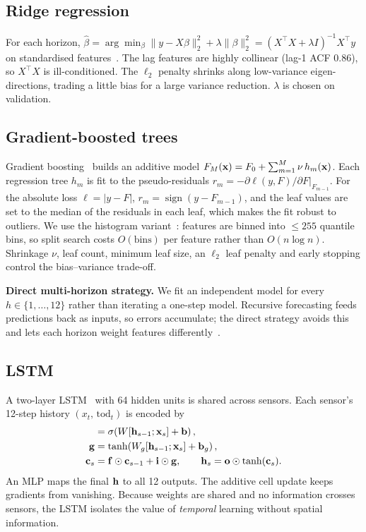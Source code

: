 \subsection{Ridge regression}
For each horizon, $\hat{\beta}=\arg\min_\beta\|y-X\beta\|_2^2+\lambda\|\beta\|_2^2
=(X^\top X+\lambda I)^{-1}X^\top y$ on standardised features~\cite{hoerl1970}. The lag
features are highly collinear (lag-1 ACF 0.86), so $X^\top X$ is ill-conditioned. The
$\ell_2$ penalty shrinks along low-variance eigen-directions, trading a little bias
for a large variance reduction. $\lambda$ is chosen on validation.

\subsection{Gradient-boosted trees}
Gradient boosting~\cite{friedman2001} builds an additive model
$F_M(\mathbf{x})=F_0+\sum_{m=1}^{M}\nu\, h_m(\mathbf{x})$. Each regression tree $h_m$ is fit
to the pseudo-residuals $r_m=-\partial \ell(y,F)/\partial F|_{F_{m-1}}$. For the
absolute loss $\ell=|y-F|$, $r_m=\operatorname{sign}(y-F_{m-1})$, and the leaf values
are set to the median of the residuals in each leaf, which makes the fit robust to
outliers. We use the histogram variant~\cite{ke2017lightgbm,pedregosa2011}: features
are binned into $\le 255$ quantile bins, so split search costs
$O(\text{bins})$ per feature rather than $O(n\log n)$. Shrinkage $\nu$, leaf count,
minimum leaf size, an $\ell_2$ leaf penalty and early stopping control the
bias--variance trade-off.

\textbf{Direct multi-horizon strategy.} We fit an independent model for every
$h\in\{1,\dots,12\}$ rather than iterating a one-step model. Recursive forecasting
feeds predictions back as inputs, so errors accumulate; the direct strategy avoids
this and lets each horizon weight features differently~\cite{taieb2012}.

\subsection{LSTM}
A two-layer LSTM~\cite{hochreiter1997} with 64 hidden units is shared across sensors.
Each sensor's 12-step history $(x_{t},\,\text{tod}_t)$ is encoded by
\begin{align}
[\,\vect{i};\vect{f};\vect{o}\,]&=\sigma\!\left(W[\vect{h}_{s-1};\vect{x}_s]+\vect{b}\right),\nonumber\\
\vect{g}&=\tanh\!\left(W_g[\vect{h}_{s-1};\vect{x}_s]+\vect{b}_g\right),\nonumber\\
\vect{c}_s&=\vect{f}\odot\vect{c}_{s-1}+\vect{i}\odot\vect{g},\qquad
\vect{h}_s=\vect{o}\odot\tanh(\vect{c}_s).
\end{align}
An MLP maps the final $\mathbf{h}$ to all 12 outputs. The additive cell update keeps
gradients from vanishing. Because weights are shared and no information crosses
sensors, the LSTM isolates the value of \emph{temporal} learning without spatial
information.

